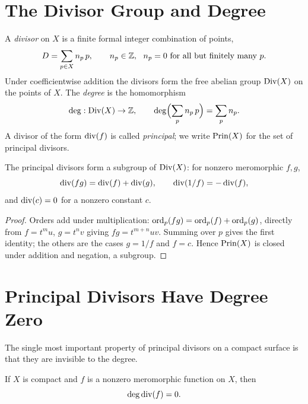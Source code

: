 \section{The Divisor Group and Degree}
\label{sec:div-group}

\begin{definition}
\label{def:div-group}
A \emph{divisor} on \(X\) is a finite formal integer combination of points,
\[
  D = \sum_{p \in X} n_p\, p, \qquad n_p \in \Z, \ \ n_p = 0 \text{ for all but finitely many } p .
\]
Under coefficientwise addition the divisors form the free abelian group
\(\operatorname{Div}(X)\) on the points of \(X\). The \emph{degree} is the homomorphism
\[
  \operatorname{deg} : \operatorname{Div}(X) \to \mathbb{Z}, \qquad \operatorname{deg}\Bigl( \sum_p n_p\, p \Bigr) = \sum_p n_p .
\]
A divisor of the form \(\operatorname{div}(f)\) is called \emph{principal}; we write
\(\operatorname{Prin}(X)\) for the set of principal divisors.
\end{definition}

\begin{proposition}
\label{prop:div-prin-subgroup}
The principal divisors form a subgroup of \(\operatorname{Div}(X)\): for nonzero meromorphic
\(f, g\),
\[
  \operatorname{div}(fg) = \operatorname{div}(f) + \operatorname{div}(g),
  \qquad
  \operatorname{div}(1/f) = -\operatorname{div}(f),
\]
and \(\operatorname{div}(c) = 0\) for a nonzero constant \(c\).
\end{proposition}

\begin{proof}
Orders add under multiplication: \(\operatorname{ord}_p(fg) = \operatorname{ord}_p(f) + \operatorname{ord}_p(g)\), directly
from \(f = t^{m}u\), \(g = t^{n}v\) giving \(fg = t^{m+n}uv\). Summing over \(p\)
gives the first identity; the others are the cases \(g = 1/f\) and \(f = c\).
Hence \(\operatorname{Prin}(X)\) is closed under addition and negation, a subgroup.
\end{proof}

\section{Principal Divisors Have Degree Zero}
\label{sec:div-degzero}

The single most important property of principal divisors on a compact surface is
that they are invisible to the degree.

\begin{theorem}
\label{thm:div-degzero}
If \(X\) is compact and \(f\) is a nonzero meromorphic function on \(X\), then
\[
  \operatorname{deg} \operatorname{div}(f) = 0 .
\]
\end{theorem}

